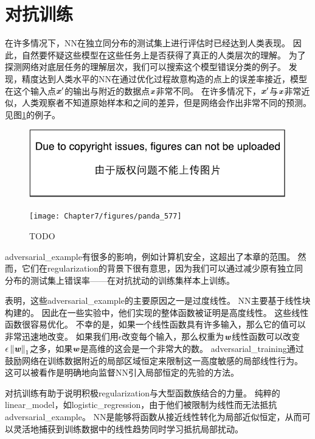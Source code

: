\section{对抗训练}
\label{sec:adversarial_training}
在许多情况下，\gls{NN}在独立同分布的测试集上进行评估时已经达到人类表现。
因此，自然要怀疑这些模型在这些任务上是否获得了真正的人类层次的理解。
为了探测网络对底层任务的理解层次，我们可以搜索这个模型错误分类的例子。
\cite{Szegedy-ICLR2014}发现，精度达到人类水平的\gls{NN}在通过优化过程故意构造的点上的误差率接近，模型在这个输入点$\boldsymbol{\mathit{x}}'$的输出与附近的数据点$\boldsymbol{\mathit{x}}$非常不同。
在许多情况下，$\boldsymbol{\mathit{x}}'$与$\boldsymbol{\mathit{x}}$非常近似，人类观察者不知道原始样本和之间的差异，但是网络会作出非常不同的预测。
见图\ref{fig:chap7_panda_577}的例子。
\begin{figure}[!htb]
\ifOpenSource
\centerline{\includegraphics{figure.pdf}}
\else
\centerline{\texttt{[image: Chapter7/figures/panda\_577]}}
\fi
\caption{TODO}
\label{fig:chap7_panda_577}
\end{figure}


\gls{adversarial_example}有很多的影响，例如计算机安全，这超出了本章的范围。
然而，它们在\gls{regularization}的背景下很有意思，因为我们可以通过减少原有独立同分布的测试集上错误率——在对抗扰动的训练集样本上训练\citep{Szegedy-ICLR2014,Goodfellow-2015-adversarial}。


\cite{Goodfellow-2015-adversarial}表明，这些\gls{adversarial_example}的主要原因之一是过度线性。
\gls{NN}主要基于线性块构建的。
因此在一些实验中，他们实现的整体函数被证明是高度线性。
这些线性函数很容易优化。
不幸的是，如果一个线性函数具有许多输入，那么它的值可以非常迅速地改变。
如果我们用$\epsilon$改变每个输入，那么权重为$\boldsymbol{\mathit{w}}$线性函数可以改变$\epsilon \left\lVert\boldsymbol{\mathit{w}}\right\rVert_1$之多，如果$\boldsymbol{\mathit{w}}$是高维的这会是一个非常大的数。
\gls{adversarial_training}通过鼓励网络在训练数据附近的局部区域恒定来限制这一高度敏感的局部线性行为。
这可以被看作是明确地向监督\gls{NN}引入局部恒定的先验的方法。

对抗训练有助于说明积极\gls{regularization}与大型函数族结合的力量。
纯粹的\gls{linear_model}，如\gls{logistic_regression}，由于他们被限制为线性而无法抵抗\gls{adversarial_example}。
\gls{NN}是能够将函数从接近线性转化为局部近似恒定，从而可以灵活地捕获到训练数据中的线性趋势同时学习抵抗局部扰动。

